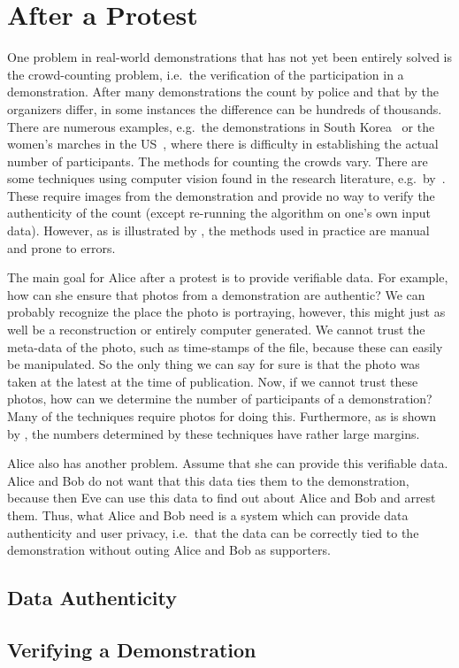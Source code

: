\section{After a Protest}
\label{AfterProtest}

One problem in real-world demonstrations that has not yet been entirely solved 
is the crowd-counting problem, i.e.\ the verification of the participation in 
a demonstration.
After many demonstrations the count by police and that by the organizers 
differ, in some instances the difference can be hundreds of thousands.
There are numerous examples, e.g.\ the demonstrations in South 
Korea~\cite{2016DemonstrationsInSeoul} or the women's marches in the 
US~\cite{2017WomensMarchesInUS}, where there is difficulty in establishing the 
actual number of participants.
The methods for counting the crowds vary.
There are some techniques using computer vision found in the research 
literature, e.g.\ by~\textcite{CVCrowdCounting}.
These require images from the demonstration and provide no way to verify the 
authenticity of the count (except re-running the algorithm on one's own input 
data).
However, as is illustrated by 
\textcite{2016DemonstrationsInSeoul,2017WomensMarchesInUS}, the methods used in 
practice are manual and prone to errors.

The main goal for Alice after a protest is to provide verifiable data.
For example, how can she ensure that photos from a demonstration are authentic?
We can probably recognize the place the photo is portraying, however, this 
might just as well be a reconstruction or entirely computer generated.
We cannot trust the meta-data of the photo, such as time-stamps of the file, 
because these can easily be manipulated.
So the only thing we can say for sure is that the photo was taken at the latest 
at the time of publication.
Now, if we cannot trust these photos, how can we determine the number of 
participants of a demonstration?
Many of the techniques require photos for doing this.
Furthermore, as is shown by 
\textcite{2016DemonstrationsInSeoul,2017WomensMarchesInUS}, the numbers 
determined by these techniques have rather large margins.

Alice also has another problem.
Assume that she can provide this verifiable data.
Alice and Bob do not want that this data ties them to the demonstration, 
because then Eve can use this data to find out about Alice and Bob and arrest 
them.
Thus, what Alice and Bob need is a system which can provide data authenticity 
and user privacy, i.e.\ that the data can be correctly tied to the 
demonstration without outing Alice and Bob as supporters.

  
\subsection{Data Authenticity}
\label{DataAuthenticity}



\subsection{Verifying a Demonstration}
\label{ProtestVerif}


